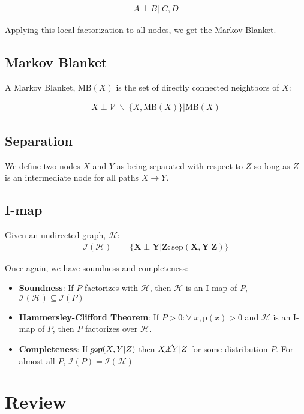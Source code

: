 \documentclass[11pt]{article}
\newcommand{\SetOf}[1]{\mathbf{#1}} %
\newcommand{\prob}[1]{\text{p}(#1)} %
\newcommand{\Eq}[1]{\begin{align*}#1\end{align*}} %
\newcommand{\boldFace}[1]{\textbf{#1}} %
\newcommand{\cursive}[1]{\mathcal{#1}}
\begin{document}
	\Eq{A \perp B | \; C,D}

	Applying this local factorization to all nodes, we get the Markov Blanket.

	\subsection{Markov Blanket}

	A Markov Blanket, $\text{MB}(X)$ is the set of directly connected neightbors of $X$:

	\Eq{X \perp \cursive{V} \; \backslash \; \{X,\text{MB}(X)\}|\text{MB}(X)}

	\subsection{Separation}
	We define two nodes $X$ and $Y$ as being separated with respect to $Z$ so long as $Z$ is an intermediate node for all paths $X \to Y$. 
	
	\subsection{I-map}
	Given an undirected graph, $\cursive{H}$:
	\Eq{\cursive{I}(\cursive{H}) &= \{ \SetOf{X} \perp \SetOf{Y}|\SetOf{Z} : \text{sep}(\SetOf{X},\SetOf{Y}|\SetOf{Z}) \}}

	Once again, we have soundness and completeness:
	\begin{itemize}
		\item \boldFace{Soundness}: If $P$ factorizes with $\cursive{H}$, then $\cursive{H}$ is an I-map of $P$,  $\cursive{I}(\cursive{H}) \subseteq \cursive{I}(P)$
		\item \boldFace{Hammersley-Clifford Theorem}: If $P > 0 : \forall \; x, \prob{x}>0$ and $\cursive{H}$ is an I-map of $P$, then $P$ factorizes over $\cursive{H}$.
		\item \boldFace{Completeness}: If $\cancel{\text{sep}}(X,Y|Z)$ then $X \cancel{\perp} Y | Z$ for some distribution $P$. For almost all $P$, $\cursive{I}(P) = \cursive{I}(\cursive{H})$
	\end{itemize}



	


 	\section{Review}
\end{document}
